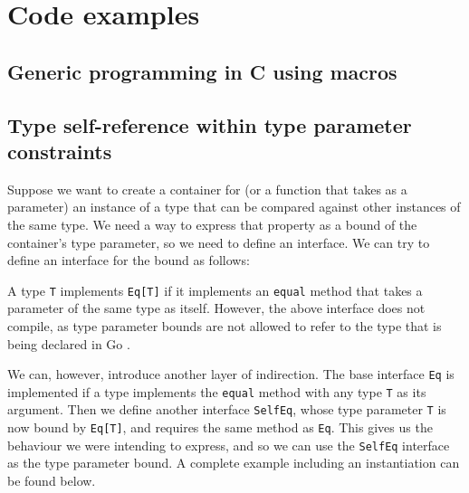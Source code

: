 \section{Code examples}

\subsection{Generic programming in C using macros}
\label{sec:generic-c}




\subsection{Type self-reference within type parameter constraints}
\label{sec:self-ref-type-in-bound}


Suppose we want to create a container for (or a function that takes as a
parameter) an instance of a type that can be compared against other instances of
the same type. We need a way to express that property as a bound of the
container's type parameter, so we need to define an interface. We can try to
define an interface for the bound as follows:

\noindent\begin{minipage}{\linewidth}
    
\end{minipage}

A type \texttt{T} implements \texttt{Eq[T]} if it implements an \texttt{equal}
method that takes a parameter of the same type as itself. However, the above
interface does not compile, as type parameter bounds are not allowed to refer to
the type that is being declared in Go \autocite{spec}.

We can, however, introduce another layer of indirection. The base interface
\texttt{Eq} is implemented if a type implements the \texttt{equal} method with
any type \texttt{T} as its argument. Then we define another interface
\texttt{SelfEq}, whose type parameter \texttt{T} is now bound by
\texttt{Eq[T]}, and requires the same method as \texttt{Eq}. This gives us the
behaviour we were intending to express, and so we can use the
\texttt{SelfEq} interface as the type parameter bound. A complete
example including an instantiation can be found below.

